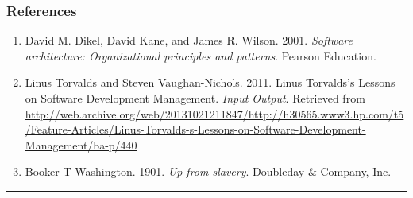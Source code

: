 \hypertarget{references}{%
\subsubsection{References}\label{references}}

\begin{enumerate}
\def\labelenumi{\arabic{enumi}.}
\item
  David M. Dikel, David Kane, and James R. Wilson. 2001. \emph{Software
  architecture: Organizational principles and patterns}. Pearson
  Education.
\item
  Linus Torvalds and Steven Vaughan-Nichols. 2011. Linus Torvalds's
  Lessons on Software Development Management. \emph{Input Output}.
  Retrieved from
  \url{http://web.archive.org/web/20131021211847/http://h30565.www3.hp.com/t5/Feature-Articles/Linus-Torvalds-s-Lessons-on-Software-Development-Management/ba-p/440}
\item
  Booker T Washington. 1901. \emph{Up from slavery}. Doubleday \&
  Company, Inc.
\end{enumerate}

\begin{center}\rule{0.5\linewidth}{0.5pt}\end{center}
